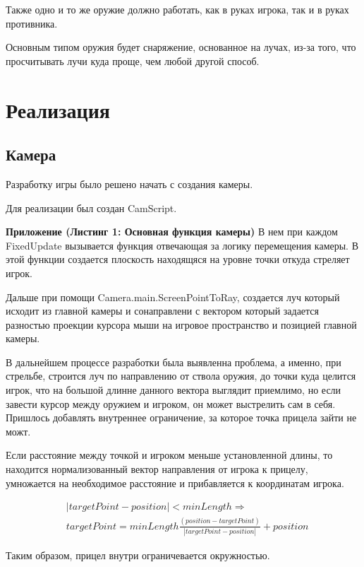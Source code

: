 \documentclass[14pt, titlepage,fleqn,a4paper]{extarticle}
\begin{document}
	Также одно и то же оружие должно работать, как в руках игрока, так и в руках противника.
	
	Основным типом оружия будет снаряжение, основанное на лучах, из-за того, что просчитывать лучи куда проще, чем любой другой способ.
	
    \section*{Реализация}
	\subsection*{Камера}
	Разработку игры было решено начать с создания камеры. 
	
	Для реализации был создан CamScript.

    \textbf{Приложение (Листинг 1: Основная функция камеры)}
    В нем при каждом FixedUpdate вызывается функция отвечающая за логику перемещения камеры. В этой функции создается плоскость находящяся на уровне точки откуда стреляет игрок. 
    
    Дальше при помощи Camera.main.ScreenPointToRay, создается луч который исходит из главной камеры и сонаправлени с вектором который задается разностью проекции курсора мыши на игровое пространство и позицией главной камеры.
    
    В дальнейшем процессе разработки была выявленна проблема, а именно, при стрельбе, строится луч по направлению от ствола оружия, до точки куда целится игрок, что на большой длинне данного вектора выглядит приемлимо, но если завести курсор между оружием и игроком, он может выстрелить сам в себя. Пришлось добавлять внутреннее ограничение, за которое точка прицела зайти не можт.
    
    Если расстояние между точкой и игроком меньше установленной длины, то находится нормализованный вектор направления от игрока к прицелу, умножается на необходимое расстояние и прибавляется к координатам игрока. 
    
    \begin{align*}
        & |targetPoint - position|< minLength \Rightarrow\\
        & targetPoint = minLength\frac{(position - targetPoint)}{|targetPoint - position|} + position
    \end{align*}
    
    Таким образом, прицел внутри ограничевается окружностью.
    
\end{document}
